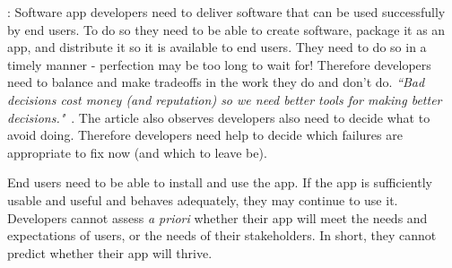 \medskip
{}: Software app developers need to deliver software that can be used successfully by end users. To do so they need to be able to create software, package it as an app, and distribute it so it is available to end users.
%
They need to do so in a timely manner - perfection may be too long to wait for! Therefore developers need to balance and make tradeoffs in the work they do and don't do. \emph{``Bad decisions cost money (and reputation) so we need better tools for making better decisions."}~. The article also observes developers also need to decide what to avoid doing. Therefore developers need help to decide which failures are appropriate to fix now (and which to leave be).

End users need to be able to install and use the app. If the app is sufficiently usable and useful and behaves adequately, they may continue to use it. Developers cannot assess \emph{a priori} whether their app will meet the needs and expectations of users, or the needs of their stakeholders.
In short, they cannot predict whether their app will thrive.


